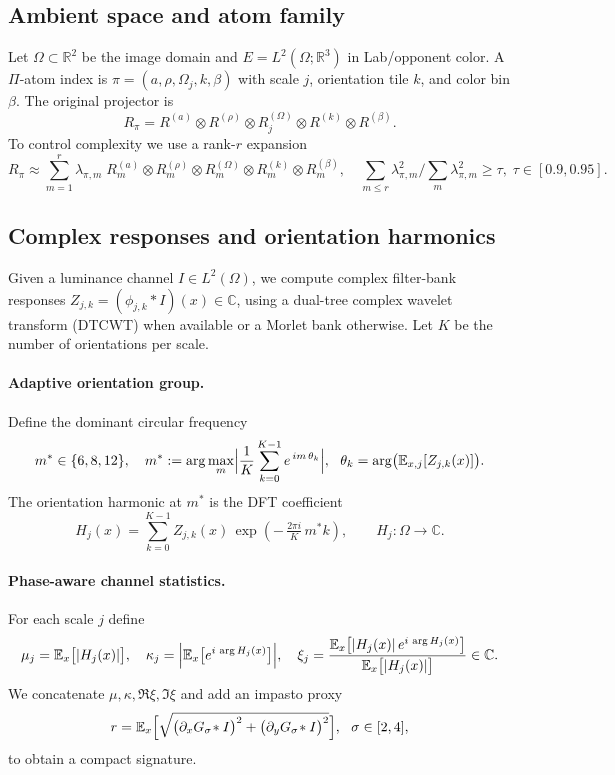 \documentclass[11pt]{article}
\newcommand{\R}{\mathbb{R}}
\newcommand{\C}{\mathbb{C}}
\newcommand{\E}{\mathbb{E}}
\begin{document}
\subsection{Ambient space and atom family}
Let $\Omega\subset\R^2$ be the image domain and $E=L^2(\Omega;\R^3)$ in Lab/opponent color. A $\Pi$-atom index is $\pi=(a,\rho,\Omega_j,k,\beta)$ with scale $j$, orientation tile $k$, and color bin $\beta$. The original projector is
\begin{equation}
R_\pi=R^{(a)}\otimes R^{(\rho)}\otimes R^{(\Omega)}_j\otimes R^{(k)}\otimes R^{(\beta)}.
\end{equation}
To control complexity we use a rank-$r$ expansion
\begin{equation}
R_\pi\approx\sum_{m=1}^{r}\lambda_{\pi,m}\; R^{(a)}_{m}\otimes R^{(\rho)}_{m}\otimes R^{(\Omega)}_{m}\otimes R^{(k)}_{m}\otimes R^{(\beta)}_{m},\quad \sum_{m\le r}\lambda_{\pi,m}^2\big/\sum_m\lambda_{\pi,m}^2\ge \tau,\;\tau\in[0.9,0.95].
\end{equation}

\subsection{Complex responses and orientation harmonics}
Given a luminance channel $I\in L^2(\Omega)$, we compute complex filter-bank responses $Z_{j,k}= (\phi_{j,k}\ast I)(x)\in\C$, using a dual-tree complex wavelet transform (DTCWT) when available or a Morlet bank otherwise. Let $K$ be the number of orientations per scale.

\paragraph{Adaptive orientation group.} Define the dominant circular frequency
\begin{equation}
 m^*\in\{6,8,12\},\quad m^*:=\arg\max_m\Bigl|\frac{1}{K}\sum_{k=0}^{K-1} e^{\,i m\,\theta_k}\Bigr|,\ \ \theta_k=\arg\bigl(\E_{x,j}[Z_{j,k}(x)]\bigr).
\end{equation}
The orientation harmonic at $m^*$ is the DFT coefficient
\begin{equation}
H_j(x)=\sum_{k=0}^{K-1}Z_{j,k}(x)\,\exp\!\left(-\,\tfrac{2\pi i}{K}\,m^*k\right),\qquad H_j: \Omega\to\C.
\end{equation}

\paragraph{Phase-aware channel statistics.} For each scale $j$ define
\begin{equation}
\mu_j=\E_x\bigl[|H_j(x)|\bigr],\quad \kappa_j=\Bigl|\E_x\bigl[e^{i\,\arg H_j(x)}\bigr]\Bigr|,\quad \xi_j=\frac{\E_x\bigl[|H_j(x)|\,e^{i\,\arg H_j(x)}\bigr]}{\E_x\bigl[|H_j(x)|\bigr]}\in\C.
\end{equation}
We concatenate $\mu,\kappa,\Re\xi,\Im\xi$ and add an impasto proxy
\begin{equation}
 r=\E_x\Bigl[\sqrt{\bigl(\partial_x G_\sigma\!\ast I\bigr)^2+\bigl(\partial_y G_\sigma\!\ast I\bigr)^2}\Bigr],\ \ \sigma\in[2,4],
\end{equation}
to obtain a compact signature.
\end{document}
